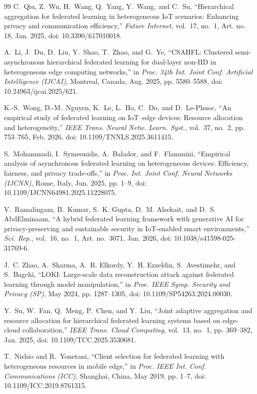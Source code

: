 \documentclass[conference]{IEEEtran}
\begin{document}
\begin{thebibliography}{99}
C.~Qiu, Z.~Wu, H.~Wang, Q.~Yang, Y.~Wang, and C.~Su, ``Hierarchical aggregation for federated learning in heterogeneous IoT scenarios: Enhancing privacy and communication efficiency,'' \textit{Future Internet}, vol.~17, no.~1, Art. no. 18, Jan. 2025, doi: 10.3390/fi17010018.

A.~Li, J.~Du, D.~Liu, Y.~Shao, T.~Zhao, and G.~Ye, ``CSAHFL: Clustered semi-asynchronous hierarchical federated learning for dual-layer non-IID in heterogeneous edge computing networks,'' in \textit{Proc. 34th Int. Joint Conf. Artificial Intelligence (IJCAI)}, Montreal, Canada, Aug. 2025, pp. 5580--5588, doi: 10.24963/ijcai.2025/621.

K.-S.~Wong, D.-M.~Nguyen, K.~Le, L.~Ho, C.~Do, and D.~Le-Phuoc, ``An empirical study of federated learning on IoT--edge devices: Resource allocation and heterogeneity,'' \textit{IEEE Trans. Neural Netw. Learn. Syst.}, vol.~37, no.~2, pp. 753--765, Feb. 2026, doi: 10.1109/TNNLS.2025.3611415.

S.~Mohammadi, I.~Symeonidis, A.~Balador, and F.~Flammini, ``Empirical analysis of asynchronous federated learning on heterogeneous devices: Efficiency, fairness, and privacy trade-offs,'' in \textit{Proc. Int. Joint Conf. Neural Networks (IJCNN)}, Rome, Italy, Jun. 2025, pp. 1--9, doi: 10.1109/IJCNN64981.2025.11228075.

V.~Ramalingam, B.~Kumar, S.~K. Gupta, D.~M. Alsekait, and D.~S. AbdElminaam, ``A hybrid federated learning framework with generative AI for privacy-preserving and sustainable security in IoT-enabled smart environments,'' \textit{Sci. Rep.}, vol.~16, no.~1, Art. no.~3071, Jan. 2026, doi: 10.1038/s41598-025-31769-6.

J.~C. Zhao, A.~Sharma, A.~R. Elkordy, Y.~H. Ezzeldin, S.~Avestimehr, and S.~Bagchi, ``LOKI: Large-scale data reconstruction attack against federated learning through model manipulation,'' in \textit{Proc. IEEE Symp. Security and Privacy (SP)}, May 2024, pp. 1287--1305, doi: 10.1109/SP54263.2024.00030.

Y.~Su, W.~Fan, Q.~Meng, P.~Chen, and Y.~Liu, ``Joint adaptive aggregation and resource allocation for hierarchical federated learning systems based on edge-cloud collaboration,'' \textit{IEEE Trans. Cloud Computing}, vol.~13, no.~1, pp. 369--382, Jan. 2025, doi: 10.1109/TCC.2025.3530681.

T.~Nishio and R.~Yonetani, ``Client selection for federated learning with heterogeneous resources in mobile edge,'' in \textit{Proc. IEEE Int. Conf. Communications (ICC)}, Shanghai, China, May 2019, pp. 1--7, doi: 10.1109/ICC.2019.8761315.


\end{thebibliography}
\end{document}
